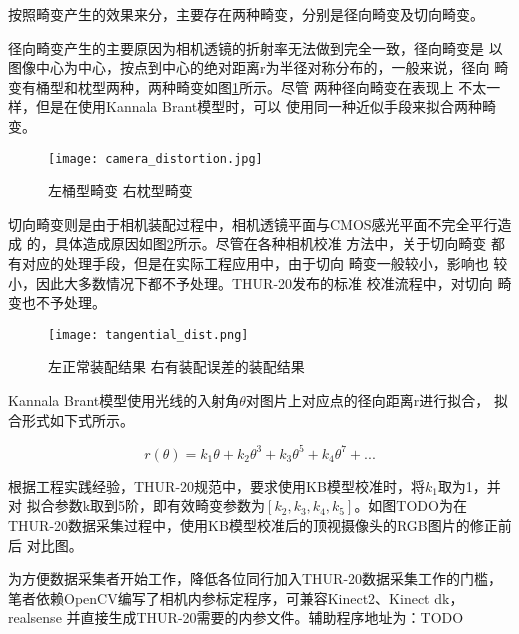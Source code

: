 按照畸变产生的效果来分，主要存在两种畸变，分别是径向畸变及切向畸变。

径向畸变产生的主要原因为相机透镜的折射率无法做到完全一致，径向畸变是
以图像中心为中心，按点到中心的绝对距离r为半径对称分布的，一般来说，径向
畸变有桶型和枕型两种，两种畸变如图\ref{fig:radial_distort}所示。尽管
两种径向畸变在表现上 不太一样，但是在使用Kannala Brant模型时，可以
使用同一种近似手段来拟合两种畸变。

\begin{figure}[h] %
  \centering
  \texttt{[image: camera\_distortion.jpg]}
  \caption{左桶型畸变 右枕型畸变}
  \label{fig:radial_distort}
\end{figure}

切向畸变则是由于相机装配过程中，相机透镜平面与CMOS感光平面不完全平行造成
的，具体造成原因如图\ref{fig:tangential_distort}所示。尽管在各种相机校准
方法中，关于切向畸变 都有对应的处理手段，但是在实际工程应用中，由于切向
畸变一般较小，影响也 较小，因此大多数情况下都不予处理。THUR-20发布的标准
校准流程中，对切向 畸变也不予处理。

\begin{figure}[h] %
  \centering
  \texttt{[image: tangential\_dist.png]}
  \caption{左正常装配结果 右有装配误差的装配结果}
  \label{fig:tangential_distort}
\end{figure}

Kannala Brant模型使用光线的入射角$\theta$对图片上对应点的径向距离r进行拟合，
拟合形式如下式所示。

\begin{equation}
  r(\theta) = k_1\theta + k_2\theta^{3} + k_3\theta^{5} + k_4\theta^{7} + ...
\end{equation}

根据工程实践经验，THUR-20规范中，要求使用KB模型校准时，将$k_1$取为1，并对
拟合参数{k}取到5阶，即有效畸变参数为$[k_2, k_3, k_4, k_5]$。如图TODO为在
THUR-20数据采集过程中，使用KB模型校准后的顶视摄像头的RGB图片的修正前后
对比图。

为方便数据采集者开始工作，降低各位同行加入THUR-20数据采集工作的门槛，
笔者依赖OpenCV编写了相机内参标定程序，可兼容Kinect2、Kinect dk，realsense
并直接生成THUR-20需要的内参文件。辅助程序地址为：TODO



